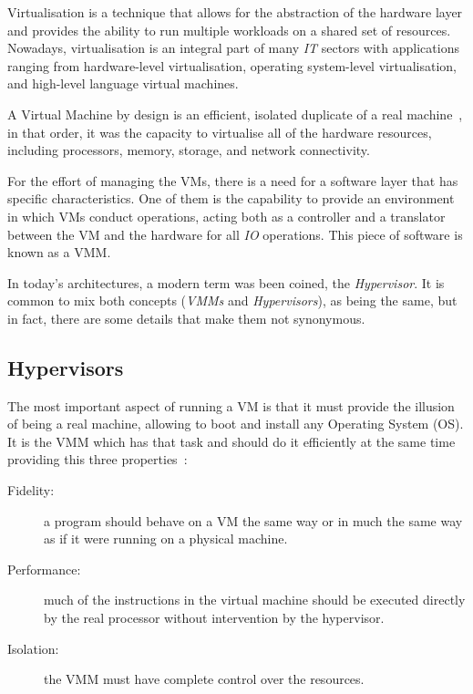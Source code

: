 Virtualisation is a technique that allows for the abstraction of the hardware layer and provides the ability to run multiple workloads on a shared set of resources. Nowadays, virtualisation is an integral part of many \textit{IT} sectors with applications ranging from hardware-level virtualisation, operating system-level virtualisation, and high-level language virtual machines.
\nocite{VMware_VM2006}

A Virtual Machine by design is an efficient, isolated duplicate of a real machine~\cite{Popek1974}, in that order, it was the capacity to virtualise all of the hardware resources, including processors, memory, storage, and network connectivity.

For the effort of managing the VMs, there is a need for a software layer that has specific characteristics. One of them is the capability to provide an environment in which VMs conduct operations, acting both as a controller and a translator between the VM and the hardware for all \textit{IO} operations. This piece of software is known as a \gls{VMM}.

In today's architectures, a modern term was been coined, the \textit{Hypervisor}. It is common to mix both concepts (\textit{VMMs} and \textit{Hypervisors}), as being the same, but in fact, there are some details that make them not synonymous.~\cite{Agesen2010}

\subsection{Hypervisors} %
\label{sub:hypervisors}

The most important aspect of running a VM is that it must provide the illusion of being a real machine, allowing to boot and install any Operating System (OS). It is the VMM which has that task and should do it efficiently at the same time providing this three properties~\cite{Popek1974}:

\begin{description}
	\item[Fidelity:] a program should behave on a VM the same way or in much the same way as if it were running on a physical machine.
	\item[Performance:] much of the instructions in the virtual machine should be executed directly by the real processor without intervention by the hypervisor.
	\item[Isolation:] the VMM must have complete control over the resources. 
\end{description}

